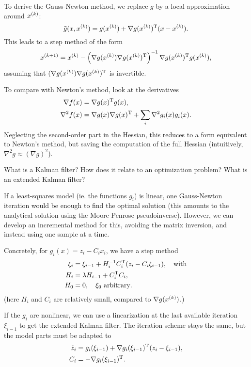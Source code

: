 \documentclass{article}
\begin{document}
To derive the Gauss-Newton method, we replace \(g\) by a local approximation around \(\kth{x}\):
\begin{equation*}
  \tilde{g}(x, \kth{x}) = g(\kth{x}) + \T{\nabla g(\kth{x})}(x - \kth{x}).
\end{equation*}
This leads to a step method of the form
\begin{equation*}
  \kth[k+1]{x} = \kth{x} - \left(\nabla g(\kth{x}) \T{\nabla g(\kth{x})}\right)^{-1} \T{\nabla g(\kth{x})} g(\kth{x}),
\end{equation*}
assuming that \((\nabla g(\kth{x}) \T{\nabla g(\kth{x})}\) is invertible.

To compare with Newton's method, look at the derivatives
\begin{align*}
  \nabla f(x) &= \T{\nabla g(x)} g(x), \\
  \nabla^2 f(x) &= \nabla g(x) \T{\nabla g(x)} + \sum_i \nabla^2 g_i(x) g_i(x).
\end{align*}
Neglecting the second-order part in the Hessian, this reduces to a form equivalent to Newton's
method, but saving the computation of the full Hessian (intuitively,
\(\nabla^2 g \approx (\nabla g)^2\)).


\begin{question}
  What is a Kalman filter? How does it relate to an optimization problem?  What is an extended
  Kalman filter?
\end{question}

If a least-squares model (ie. the functions \(g_i\)) is linear, one Gauss-Newton iteration would be
enough to find the optimal solution (this amounts to the analytical solution using the Moore-Penrose
pseudoinverse).  However, we can develop an incremental method for this, avoiding the matrix
inversion, and instead using one sample at a time.

Concretely, for \(g_i(x) = z_i - C_i x_i\), we have a step method
\begin{align*}
  \xi_i &= \xi_{i-1} + H_i^{-1}\T{C_i}(z_i - C_i \xi_{i-1}), \quad\text{with} \\
  H_i &= \lambda H_{i-1} + \T{C_i}C_i, \\
  H_0 &= 0,\quad \xi_0 \text{ arbitrary}.
\end{align*}
(here \(H_i\) and \(C_i\) are relatively small, compared to \(\nabla g(\kth{x})\).)

If the \(g_i\) are nonlinear, we can use a linearization at the last available iteration
\(\xi_{i-1}\) to get the extended Kalman filter.  The iteration scheme stays the same, but the model
parts must be adapted to
\begin{align*}
  \tilde{z}_i &= g_i(\xi_{i-1}) + \T{\nabla g_i(\xi_{i-1})}(z_i - \xi_{i-1}), \\
  C_i &= - \T{\nabla g_i(\xi_{i-1})}.
\end{align*}
\end{document}
